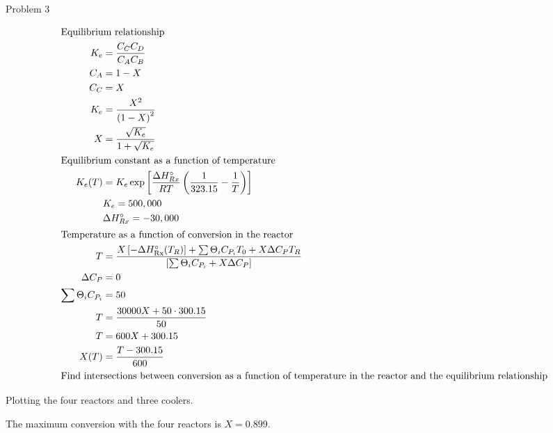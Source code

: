 \item Problem 3

\begin{align*}
    \intertext{Equilibrium relationship}
    K_e &= \frac{C_C C_D}{C_A C_B} \\
    C_A &= 1 - X \\
    C_C &= X \\
    K_e &= \frac{X^2}{\left(1 - X\right)^2} \\
    X &= \frac{\sqrt{K_e}}{1 + \sqrt{K_e}} \\
    \intertext{Equilibrium constant as a function of temperature}
    K_e(T) &= K_e \exp \left[\frac{\Delta H_{Rx}^\circ}{RT}\left(\frac{1}{323.15} - \frac{1}{T}\right)\right] \\
    & K_e = 500,000 \\
    & \Delta H_{Rx}^\circ = -30,000 \\
    \intertext{Temperature as a function of conversion in the reactor}
    T &= \frac{X \left[-\Delta H_{\text{Rx}}^\circ(T_R)\right] + \sum\Theta_iC_{P_i}T_0 + X\Delta C_P T_R}{\left[\sum\Theta_iC_{P_i} +  X\Delta C_P\right]} \\
    \Delta C_P &= 0 \\
    \sum\Theta_iC_{P_i} &= 50 \\
    T &= \frac{30000X + 50 \cdot 300.15}{50} \\
    T &= 600 X + 300.15 \\
    X(T) &= \frac{T - 300.15}{600} \\
    \intertext{Find intersections between conversion as a function of temperature in the reactor and the equilibrium relationship}
\end{align*}

Plotting the four reactors and three coolers.

\begin{center}
    
\end{center}

The maximum conversion with the four reactors is $\boxed{X = 0.899}$.